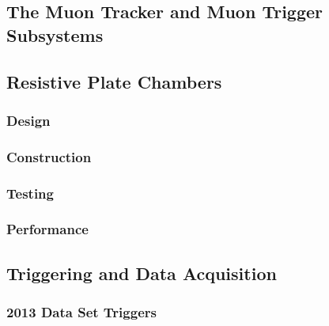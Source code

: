 \subsection{The Muon Tracker and Muon Trigger Subsystems}
\subsection{Resistive Plate Chambers}
\subsubsection{Design}
\subsubsection{Construction}
\subsubsection{Testing}
\subsubsection{Performance}
\subsection{Triggering and Data Acquisition}
\subsubsection{2013 Data Set Triggers}
